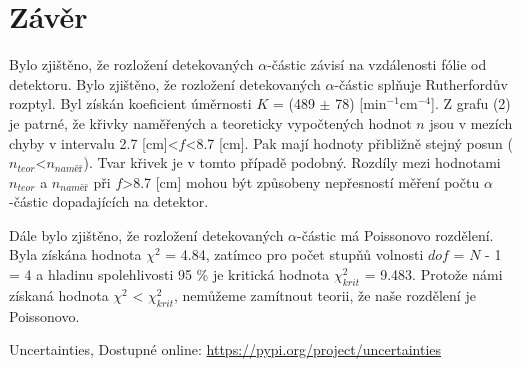 \documentclass[a4paper,11pt]{article}
\begin{document}
        \section{Závěr} 
                \par Bylo zjištěno, že rozložení detekovaných $\alpha$-částic závisí na vzdálenosti fólie od detektoru. Bylo zjištěno, že rozložení detekovaných $\alpha$-částic splňuje Rutherfordův rozptyl. Byl získán koeficient úměrnosti $K$ = (489 $\pm$ 78) [min$^{-1}$cm$^{-4}$]. Z grafu (2) je patrné, že křivky naměřených a teoreticky vypočtených hodnot $n$ jsou v mezích chyby v intervalu 2.7 [cm]<$f$<8.7 [cm]. Pak mají hodnoty přibližně stejný posun ($n_{teor}$<$n_{naměř}$). Tvar křivek je v tomto případě podobný. Rozdíly mezi hodnotami $n_{teor}$ a $n_{naměř}$ při $f$>8.7 [cm] mohou být způsobeny nepřesností měření počtu $\alpha$-částic dopadajících na detektor. 
                \vspace{10pt}
                \par Dále bylo zjištěno, že rozložení detekovaných $\alpha$-částic má Poissonovo rozdělení. Byla získána hodnota $\chi^2$ = 4.84, zatímco pro počet stupňů volnosti $dof$ = $N$ - 1 = 4 a hladinu spolehlivosti 95 \% je kritická hodnota $\chi^2_{krit}$ = 9.483. Protože námi získaná hodnota $\chi^2$ < $\chi^2_{krit}$, nemůžeme zamítnout teorii, že naše rozdělení je Poissonovo.

                \renewcommand{\refname}{Odkazy}
                \begin{thebibliography}{9}
                        Uncertainties, Dostupné online: \url{https://pypi.org/project/uncertainties}
                \end{thebibliography} 
\end{document}
